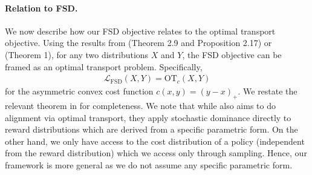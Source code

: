 
\paragraph{Relation to FSD.}
We now describe how our FSD objective relates to the optimal transport objective. Using the results from \citet{Santambrogio2015OptimalTF} (Theorem 2.9 and Proposition 2.17) or \citet{melnyk2024distributional} (Theorem 1), for any two distributions $X$ and $Y$, the FSD objective can be framed as an optimal transport problem. Specifically,
\begin{align}\label{eq:otl}
  \mathcal{L}_\mathrm{FSD}(X,Y) = \mathrm{OT}_c(X,Y)
\end{align}
for the asymmetric convex cost function $c(x,y)=(y-x)_+$. We restate the relevant theorem in  for completeness. We note that while \cite{melnyk2024distributional} also aims to do alignment via optimal transport, they apply stochastic dominance directly to reward distributions which are derived from a specific parametric form. On the other hand, we only have access to the cost distribution of a policy (independent from the reward distribution) which we access only through sampling. Hence, our framework is more general as we do not assume any specific parametric form. 




